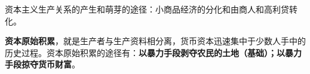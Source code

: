 资本主义生产关系的产生和萌芽的途径：小商品经济的分化和由商人和高利贷转化。

\textbf{资本原始积累}{，就是生产者与生产资料相分离，货币资本迅速集中于少数人手中的历史过程。资本原始积累的途径有：}\textbf{以暴力手段剥夺农民的土地（基础）；以暴力手段掠夺货币财富}{。}
